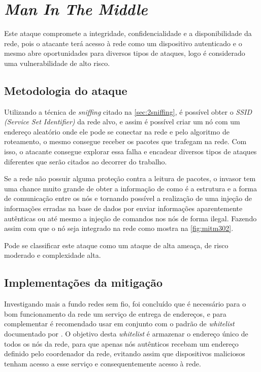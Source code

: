 \section{\emph{Man In The Middle}}
\label{sec:3mitm}
\par Este ataque compromete a integridade, confidencialidade e a disponibilidade da rede, pois o atacante ter\'a acesso \`a rede como um dispositivo autenticado e o mesmo abre oportunidades para diversos tipos de ataques, logo \'e considerado uma vulnerabilidade de alto risco.

\subsection{Metodologia do ataque}
\par Utilizando a técnica de \emph{sniffing} citado na \autoref{sec:2sniffing}, é possível obter o \emph{SSID (Service Set Identifier)} da rede alvo, e assim é possível criar um nó com um endereço aleatório onde ele pode se conectar na rede e pelo algoritmo de roteamento, o mesmo consegue receber os pacotes que trafegam na rede. Com isso, o atacante consegue explorar essa falha e encadear diversos tipos de ataques diferentes que ser\~ao citados ao decorrer do trabalho.


\par Se a rede n\~ao possuir alguma prote\c{c}\~ao contra a leitura de pacotes, o invasor tem uma chance muito grande de obter a informa\c{c}\~ao de como é a estrutura e a forma de comunicação entre os nós e tornando possível a realiza\c{c}\~ao de uma injeção de informações erradas na base de dados por enviar informações aparentemente autênticas ou at\'e mesmo a inje\c{c}\~ao de comandos nos n\'os de forma ilegal. Fazendo assim com que o n\'o seja integrado na rede como mostra na \autoref{fig:mitm302}.



\par Pode se classificar este ataque como um ataque de alta amea\c{c}a, de risco moderado e complexidade alta.

\subsection{Implementações da mitigação}
\par Investigando mais a fundo redes sem fio, foi conclu\'ido que \'e necess\'ario para o bom funcionamento da rede um servi\c{c}o de entrega de endere\c{c}os, e para complementar \'e recomendado usar em conjunto com o padrão de \emph{whitelist} documentado por . O objetivo desta \emph{whitelist} é armazenar o endere\c{c}o \'unico de todos os n\'os da rede, para que apenas n\'os aut\^enticos recebam um endere\c{c}o definido pelo coordenador da rede, evitando assim que dispositivos maliciosos tenham acesso a esse servi\c{c}o e consequentemente acesso \`a rede.

